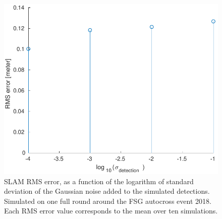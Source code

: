 \begin{figure}
    \centering
    \includegraphics[width=0.8\linewidth]{0_Images/6_Results/SLAMERMS.pdf}
    \caption[SLAM RMS error.]
    {SLAM RMS error, as a function of the logarithm of standard deviation of the Gaussian noise added to the simulated detections. Simulated on one full round around the FSG autocross event 2018. Each RMS error value corresponds to the mean over ten simulations.}
    \label{Fig:SLAMERMS}
\end{figure}